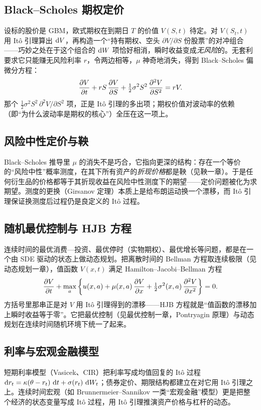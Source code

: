 \subsection{Black–Scholes 期权定价}

设标的股价是 GBM，欧式期权在到期日 $T$ 的价值 $V(S,t)$ 待定。对 $V(S_t,t)$ 用 Itô 引理算出 $\mathop{}\!\mathrm{d} V$，再构造一个``持有期权、空头 $\partial V/\partial S$ 份股票''的对冲组合——巧妙之处在于这个组合的 $\mathop{}\!\mathrm{d} W$ 项恰好相消，瞬时收益变成\emph{无风险}的。无套利要求它只能赚无风险利率 $r$，令两边相等，$\mu$ 神奇地消失，得到 Black–Scholes 偏微分方程：
\[
    \frac{\partial V}{\partial t}+rS\,\frac{\partial V}{\partial S}+\tfrac12\sigma^2 S^2\,\frac{\partial^{2} V}{\partial S^{2}}=rV .
\]
那个 $\tfrac12\sigma^2 S^2\,\partial^2 V/\partial S^2$ 项，正是 Itô 引理的多出项；期权价值对波动率的依赖（即``为什么波动率是期权的核心''）全压在这一项上。

\subsection{风险中性定价与鞅}

Black–Scholes 推导里 $\mu$ 的消失不是巧合，它指向更深的结构：存在一个等价的``风险中性''概率测度，在其下所有资产的\emph{折现价格}都是鞅（见鞅一章）。于是任何衍生品的价格都等于其折现收益在风险中性测度下的期望——定价问题被化为求期望。测度的更换（Girsanov 定理）本质上是给布朗运动换一个漂移，而 Itô 引理保证换测度后过程仍是良定义的 Itô 过程。

\subsection{随机最优控制与 HJB 方程}

连续时间的最优消费—投资、最优停时（实物期权）、最优增长等问题，都是在一个由 SDE 驱动的状态上做动态规划。把离散时间的 Bellman 方程取连续极限（见动态规划一章），值函数 $V(x,t)$ 满足 Hamilton–Jacobi–Bellman 方程
\[
    \frac{\partial V}{\partial t}+\max_{a}\left\{u(x,a)+\mu(x,a)\,\frac{\partial V}{\partial x}+\tfrac12\sigma^2(x,a)\,\frac{\partial^{2} V}{\partial x^{2}}\right\}=0 .
\]
方括号里那串正是对 $V$ 用 Itô 引理得到的漂移——HJB 方程就是``值函数的漂移加上瞬时收益等于零''。它把最优控制（见最优控制一章，Pontryagin 原理）与动态规划在连续时间随机环境下统一了起来。

\subsection{利率与宏观金融模型}

短期利率模型（Vasicek、CIR）把利率写成均值回复的 Itô 过程 $\mathop{}\!\mathrm{d} r_t=\kappa(\theta-r_t)\,\mathop{}\!\mathrm{d} t+\sigma(r_t)\,\mathop{}\!\mathrm{d} W_t$；债券定价、期限结构都建立在对它用 Itô 引理之上。连续时间宏观（如 Brunnermeier–Sannikov 一类``宏观金融''模型）更是把整个经济的状态变量写成 Itô 过程，用 Itô 引理推演资产价格与杠杆的动态。

